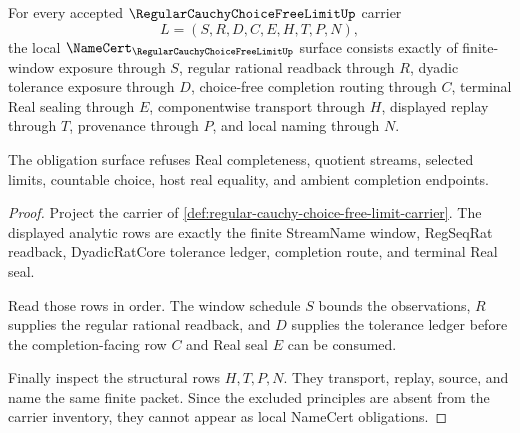 \begin{theorem}
\label{thm:regular-cauchy-choice-free-limit-namecert-obligations}
For every accepted $\RegularCauchyChoiceFreeLimitUp$ carrier
$$
L=(S,R,D,C,E,H,T,P,N),
$$
the local $\NameCert_{\RegularCauchyChoiceFreeLimitUp}$ surface consists exactly of finite-window exposure through $S$, regular rational readback through $R$, dyadic tolerance exposure through $D$, choice-free completion routing through $C$, terminal Real sealing through $E$, componentwise transport through $H$, displayed replay through $T$, provenance through $P$, and local naming through $N$.

The obligation surface refuses Real completeness, quotient streams, selected limits, countable choice, host real equality, and ambient completion endpoints.
\end{theorem}
\begin{proof}
Project the carrier of \autoref{def:regular-cauchy-choice-free-limit-carrier}. The displayed analytic rows are exactly the finite StreamName window, RegSeqRat readback, DyadicRatCore tolerance ledger, completion route, and terminal Real seal.

Read those rows in order. The window schedule $S$ bounds the observations, $R$ supplies the regular rational readback, and $D$ supplies the tolerance ledger before the completion-facing row $C$ and Real seal $E$ can be consumed.

Finally inspect the structural rows $H,T,P,N$. They transport, replay, source, and name the same finite packet. Since the excluded principles are absent from the carrier inventory, they cannot appear as local NameCert obligations.
\end{proof}

